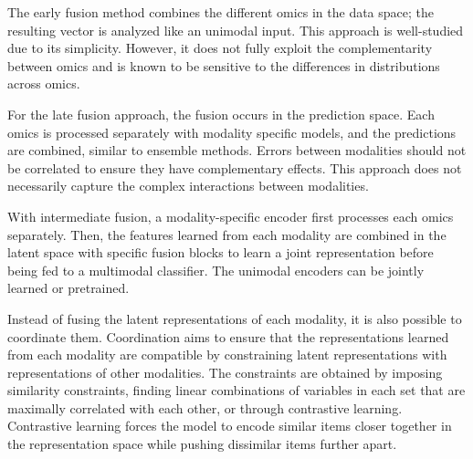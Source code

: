 \documentclass[../main.tex]{subfiles}
\begin{document}
		\begin{description}[%
				style=multiline,
				leftmargin=!,
				labelwidth=2.5cm,
			]
			\item[Early fusion]
				The early fusion method combines the different omics in the data space; the resulting vector is analyzed like an unimodal input.
				This approach is well-studied due to its simplicity.
				However, it does not fully exploit the complementarity between omics and is known to be sensitive to the differences in distributions across omics.
			\item[Late fusion]
				For the late fusion approach, the fusion occurs in the prediction space.
				Each omics is processed separately with modality specific models, and the predictions are combined, similar to ensemble methods.
				Errors between modalities should not be correlated to ensure they have complementary effects.
				This approach does not necessarily capture the complex interactions between modalities.
			\item[Intermediate fusion]
				With intermediate fusion, a modality-specific encoder first processes each omics separately.
				Then, the features learned from each modality are combined in the latent space with specific fusion blocks to learn a joint representation before being fed to a multimodal classifier.
				The unimodal encoders can be jointly learned or pretrained.
		\end{description}
		Instead of fusing the latent representations of each modality, it is also possible to coordinate them.
		Coordination aims to ensure that the representations learned from each modality are compatible by constraining latent representations with representations of other modalities.
		The constraints are obtained by imposing similarity constraints, finding linear combinations of variables in each set that are maximally correlated with each other, or through contrastive learning.
		Contrastive learning forces the model to encode similar items closer together in the representation space while pushing dissimilar items further apart.
\end{document}
